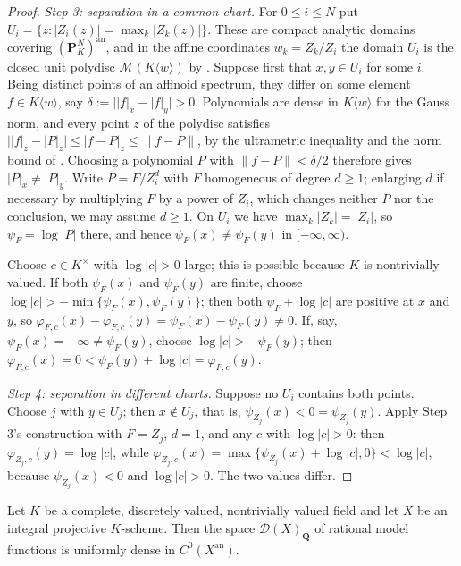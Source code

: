 \begin{proof}
\emph{Step 3: separation in a common chart.} For $0\le i\le N$ put
$U_i=\{z:|Z_i(z)|=\max_k|Z_k(z)|\}$. These are compact analytic domains
covering $(\mathbf P^N_K)^{\mathrm{an}}$, and in the affine coordinates
$w_k=Z_k/Z_i$ the domain $U_i$ is the closed unit polydisc
$\mathcal M(K\langle w\rangle)$ by
. Suppose first that $x,y\in U_i$ for
some $i$. Being distinct points of an affinoid spectrum, they differ on
some element $f\in K\langle w\rangle$, say
$\delta:=\bigl||f|_x-|f|_y\bigr|>0$. Polynomials are dense in
$K\langle w\rangle$ for the Gauss norm, and every point $z$ of the
polydisc satisfies $\bigl||f|_z-|P|_z\bigr|\le|f-P|_z\le\|f-P\|$, by the
ultrametric inequality and the norm bound of
. Choosing a polynomial $P$ with
$\|f-P\|<\delta/2$ therefore gives $|P|_x\ne|P|_y$. Write
$P=F/Z_i^d$ with $F$ homogeneous of degree $d\ge1$; enlarging $d$
if necessary by multiplying $F$ by a power of $Z_i$, which changes
neither $P$ nor the conclusion, we may assume $d\ge1$. On $U_i$ we
have $\max_k|Z_k|=|Z_i|$, so $\psi_F=\log|P|$ there, and hence
$\psi_F(x)\ne\psi_F(y)$ in $[-\infty,\infty)$.

Choose $c\in K^\times$ with $\log|c|>0$ large; this is possible because
$K$ is nontrivially valued. If both $\psi_F(x)$ and $\psi_F(y)$ are
finite, choose $\log|c|>-\min\{\psi_F(x),\psi_F(y)\}$; then both
$\psi_F+\log|c|$ are positive at $x$ and $y$, so
$\varphi_{F,c}(x)-\varphi_{F,c}(y)=\psi_F(x)-\psi_F(y)\ne0$. If, say,
$\psi_F(x)=-\infty\ne\psi_F(y)$, choose $\log|c|>-\psi_F(y)$; then
$\varphi_{F,c}(x)=0<\psi_F(y)+\log|c|=\varphi_{F,c}(y)$.

\emph{Step 4: separation in different charts.} Suppose no $U_i$ contains
both points. Choose $j$ with $y\in U_j$; then $x\notin U_j$, that is,
$\psi_{Z_j}(x)<0=\psi_{Z_j}(y)$. Apply Step 3's construction with
$F=Z_j$, $d=1$, and any $c$ with $\log|c|>0$: then
$\varphi_{Z_j,c}(y)=\log|c|$, while
$\varphi_{Z_j,c}(x)=\max\{\psi_{Z_j}(x)+\log|c|,0\}<\log|c|$, because
$\psi_{Z_j}(x)<0$ and $\log|c|>0$. The two values differ.
\end{proof}

\begin{proposition}
\label{prop:metrics-model-function-density}
Let $K$ be a complete, discretely valued, nontrivially valued field and let
$X$ be an integral projective $K$-scheme. Then the space
$\mathcal D(X)_{\mathbf Q}$ of rational model functions is uniformly dense
in $C^0(X^{\mathrm{an}})$.
\end{proposition}

